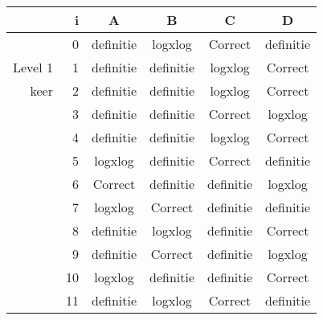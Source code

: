 \begin{tabular}{ rr| c|c|c|c}\hline\hline
     & i & \textbf{A} & \textbf{B} & \textbf{C} & \textbf{D}\\\hline

&0&definitie&logxlog&Correct\cellcolor[gray]{0.6}&definitie\\
Level 1 & 1&definitie&definitie&logxlog&Correct\cellcolor[gray]{0.6}\\
keer &2&definitie&definitie&logxlog&Correct\cellcolor[gray]{0.6}\\
&3&definitie&definitie&Correct\cellcolor[gray]{0.6}&logxlog\\
&4&definitie&definitie&logxlog&Correct\cellcolor[gray]{0.6}\\
&5&logxlog&definitie&Correct\cellcolor[gray]{0.6}&definitie\\
&6&Correct\cellcolor[gray]{0.6}&definitie&definitie&logxlog\\
&7&logxlog&Correct\cellcolor[gray]{0.6}&definitie&definitie\\
&8&definitie&logxlog&definitie&Correct\cellcolor[gray]{0.6}\\
&9&definitie&Correct\cellcolor[gray]{0.6}&definitie&logxlog\\
&10&logxlog&definitie&definitie&Correct\cellcolor[gray]{0.6}\\
&11&definitie&logxlog&Correct\cellcolor[gray]{0.6}&definitie\\
\hline\end{tabular}\par\ \newline


